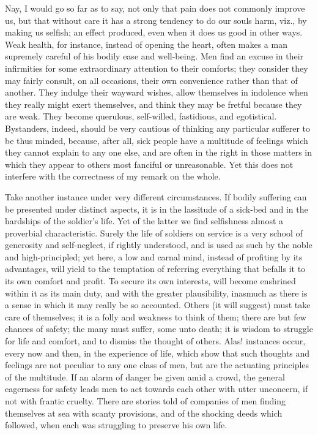 Nay, I would go so far as to say, not only that pain does not
commonly improve us, but that without care it has a strong tendency to
do our souls harm, viz., by making us selfish; an effect produced,
even when it does us good in other ways. Weak health, for instance,
instead of opening the heart, often makes a man supremely careful of
his bodily ease and well-being. Men find an excuse in their
infirmities for some extraordinary attention to their comforts; they
consider they may fairly consult, on all occasions, their own
convenience rather than that of another. They indulge their wayward
wishes, allow themselves in indolence when they really might exert
themselves, and think they may be fretful because they are weak. They
become querulous, self-willed, fastidious, and egotistical.
Bystanders, indeed, should be very cautious of thinking any particular
sufferer to be thus minded, because, after all, sick people have a
multitude of feelings which they cannot explain to any one else, and
are often in the right in those matters in which they appear to others
most fanciful or unreasonable. Yet this does not interfere with the
correctness of my remark on the whole.

Take another instance under very different circumstances. If bodily
suffering can be presented under distinct aspects, it is in the
lassitude of a sick-bed and in the hardships of the soldier's life.
Yet of the latter we find selfishness almost a proverbial
characteristic. Surely the life of soldiers on service is a very
school of generosity and self-neglect, if rightly understood, and is
used as such by the noble and high-principled; yet here, a low and
carnal mind, instead of profiting by its advantages, will yield to the
temptation of referring everything that befalls it to its own comfort
and profit. To secure its own interests, will become enshrined within
it as its main duty, and with the greater plausibility, inasmuch as
there is a sense in which it may really be so accounted. Others (it
will suggest) must take care of themselves; it is a folly and weakness
to think of them; there are but few chances of safety; the many must
suffer, some unto death; it is wisdom to struggle for life and
comfort, and to dismiss the thought of others. Alas! instances occur,
every now and then, in the experience of life, which show that such
thoughts and feelings are not peculiar to any one class of men, but
are the actuating principles of the multitude. If an alarm of danger
be given amid a crowd, the general eagerness for safety leads men to
act towards each other with utter unconcern, if not with frantic
cruelty. There are stories told of companies of men finding themselves
at sea with scanty provisions, and of the shocking deeds which
followed, when each was struggling to preserve his own life.

